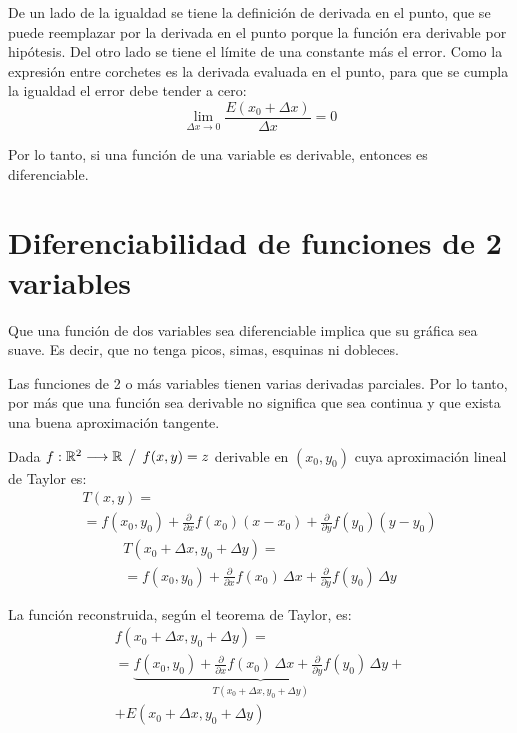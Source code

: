 De un lado de la igualdad se tiene la definición de derivada en el punto, que se puede reemplazar por la derivada en el punto porque la función era derivable por hipótesis.
Del otro lado se tiene el límite de una constante más el error.
Como la expresión entre corchetes es la derivada evaluada en el punto, para que se cumpla la igualdad el error debe tender a cero:
\begin{equation*}
    \lim_{\Delta x \to 0} \frac{E(x_0 + \Delta x)}{\Delta x} = 0
\end{equation*}

Por lo tanto, si una función de una variable es derivable, entonces es diferenciable.


\section{Diferenciabilidad de funciones de 2 variables}

Que una función de dos variables sea diferenciable implica que su gráfica sea suave.
Es decir, que no tenga picos, simas, esquinas ni dobleces.

Las funciones de 2 o más variables tienen varias derivadas parciales.
Por lo tanto, por más que una función sea derivable no significa que sea continua y que exista una buena aproximación tangente.

Dada $f: \mathbb{R}^2 \longrightarrow \mathbb{R} \hspace{1ex} \big/ \hspace{1ex} f(x,y)=z$ derivable en $(x_0,y_0)$ cuya aproximación lineal de Taylor es:
\begin{multline*}
    T(x,y) =
    \\
    = f(x_0,y_0) + \frac{\partial}{\partial x} f(x_0) \left( x-x_0 \right) + \frac{\partial}{\partial y} f(y_0) \left( y-y_0 \right)
\end{multline*}
\begin{multline*}
    T(x_0 + \Delta x,y_0 + \Delta y) =
    \\
    = f(x_0,y_0) + \frac{\partial}{\partial x} f(x_0) \, \Delta x + \frac{\partial}{\partial y} f(y_0) \, \Delta y
\end{multline*}

La función reconstruida, según el teorema de Taylor, es:
\begin{multline*}
    f(x_0 + \Delta x,y_0 + \Delta y) =
    \\
    = \underbrace{f(x_0,y_0) + \frac{\partial}{\partial x} f(x_0) \, \Delta x + \frac{\partial}{\partial y} f(y_0) \, \Delta y}_{T(x_0 + \Delta x,y_0 + \Delta y)} +
    \\
    + E(x_0 + \Delta x,y_0 + \Delta y)
\end{multline*}

